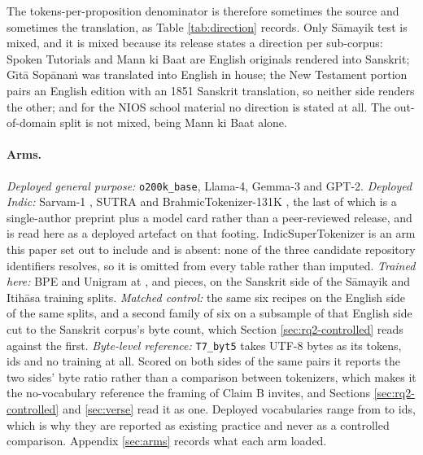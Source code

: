 \documentclass[11pt]{article}
\begin{document}
The tokens-per-proposition denominator is therefore sometimes the source and sometimes
the translation, as Table \ref{tab:direction} records. Only S\=amayik test is mixed, and it
is mixed because its release states a direction per sub-corpus: Spoken Tutorials and Mann
ki Baat are English originals rendered into Sanskrit; G\={\i}t\=a Sop\=ana\.{m} was
translated into English in house; the New Testament portion pairs an English edition with
an 1851 Sanskrit translation, so neither side renders the other; and for the NIOS school
material no direction is stated at all. The out-of-domain split is not mixed, being Mann
ki Baat alone.

\paragraph{Arms.} \emph{Deployed general purpose:} \texttt{o200k\_base},
Llama-4, Gemma-3 and GPT-2. \emph{Deployed Indic:} Sarvam-1 \citep{sarvam-2024}, SUTRA
\citep{bendale-etal-2024-sutra} and BrahmicTokenizer-131K \citep{shravan-2026-brahmic},
the last of which is a single-author preprint plus a model card rather than a
peer-reviewed release, and is read here as a deployed artefact on that footing.
IndicSuperTokenizer is an arm this paper set out to include and is absent: none of the
three candidate repository identifiers resolves, so it is omitted from every table rather
than imputed. \emph{Trained here:} BPE \citep{gage-1994-algorithm,sennrich-etal-2016-neural}
and Unigram \citep{kudo-2018-subword,kudo-richardson-2018-sentencepiece} at
\numVocabSmall, \numVocabLarge{} and \numVocabHuge{} pieces, on the Sanskrit side of the
S\=amayik and Itih\=asa training splits. \emph{Matched control:} the same six recipes on
the English side of the same splits, and a second family of six on a subsample of that
English side cut to the Sanskrit corpus's byte count, which
Section \ref{sec:rq2-controlled} reads against the first.
\emph{Byte-level reference:} \texttt{T7\_byt5} takes UTF-8 bytes as its tokens,
\numTSevenVocab{} ids and no training at all. Scored on both sides of the same pairs it
reports the two sides' byte ratio rather than a comparison between tokenizers, which makes
it the no-vocabulary reference the framing of Claim B invites, and
Sections \ref{sec:rq2-controlled} and \ref{sec:verse} read it as one. Deployed vocabularies
range from \numVocabMin{} to
\numVocabMax{} ids, which is why they are reported as existing practice and never as a
controlled comparison. Appendix \ref{sec:arms} records what each arm loaded.
\end{document}
